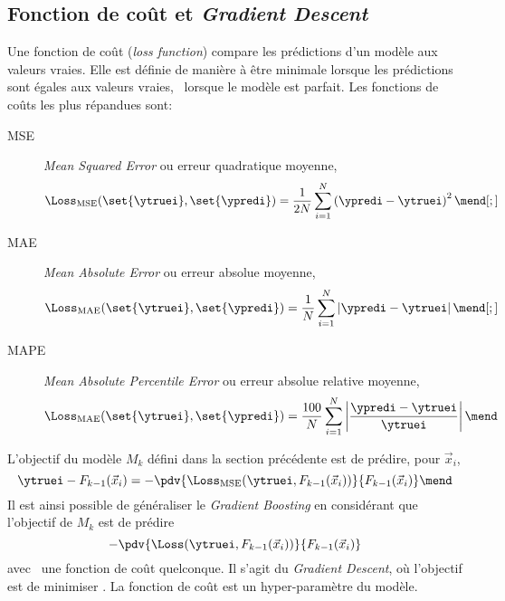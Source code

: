 \subsection{Fonction de coût et \emph{Gradient Descent}}
Une fonction de coût (\emph{loss function}) compare les prédictions d'un modèle aux valeurs vraies.
Elle est définie de manière à être minimale lorsque les prédictions sont égales aux valeurs vraies, \ie\ lorsque le modèle est parfait.
Les fonctions de coûts les plus répandues sont:
\begin{description}
\item[MSE] \emph{Mean Squared Error} ou erreur quadratique moyenne,
\begin{equation}
\Loss_\text{MSE}(\set{\ytruei}, \set{\ypredi}) = \frac{1}{2N} \sum_{i=1}^N \left( \ypredi - \ytruei \right)^2
\label{eq-loss_MSE}
\mend[;]
\end{equation}
\item[MAE] \emph{Mean Absolute Error} ou erreur absolue moyenne,
\begin{equation}
\Loss_\text{MAE}(\set{\ytruei}, \set{\ypredi}) = \frac{1}{N} \sum_{i=1}^N \left| \ypredi - \ytruei \right|
\label{eq-loss_MAE}
\mend[;]
\end{equation}
\item[MAPE] \emph{Mean Absolute Percentile Error} ou erreur absolue relative moyenne,
\begin{equation}
\Loss_\text{MAE}(\set{\ytruei}, \set{\ypredi}) = \frac{100}{N} \sum_{i=1}^N \left| \frac{\ypredi - \ytruei}{\ytruei} \right|
\label{eq-loss_MAPE}
\mend
\end{equation}
\end{description}
\par
L'objectif du modèle $M_k$ défini dans la section précédente est de prédire, pour $\vec{x}_i$,
\begin{equation}
\ytruei - F_{k-1}(\vec{x}_i)
=
- \pdv{\Loss_\text{MSE}(\ytruei, F_{k-1}(\vec{x}_i))}{F_{k-1}(\vec{x}_i)}
\mend
\end{equation}
Il est ainsi possible de généraliser le \emph{Gradient Boosting}
en considérant que l'objectif de $M_k$ est de prédire
\begin{equation}
- \pdv{\Loss(\ytruei, F_{k-1}(\vec{x}_i))}{F_{k-1}(\vec{x}_i)}
\end{equation}
avec \Loss\ une fonction de coût quelconque.
Il s'agit du \emph{Gradient Descent},
où l'objectif est de minimiser \Loss.
La fonction de coût est un hyper-paramètre du modèle.
